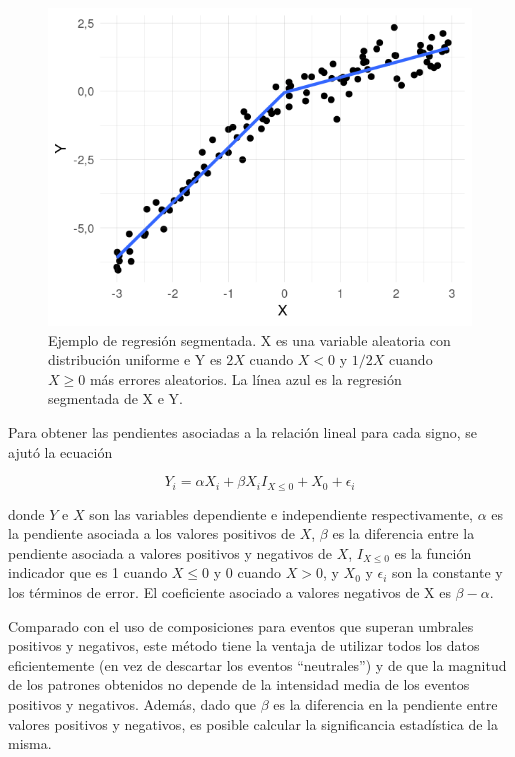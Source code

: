 \documentclass[12pt,oneside,a4paper]{reedthesis}
\begin{document}
\begin{figure}

{\centering \includegraphics{figures/30-sam/segmentada-ejemplo-1} 

}

\caption{Ejemplo de regresión segmentada. X es una variable aleatoria con distribución uniforme e Y es \(2X\) cuando \(X<0\) y \(1/2X\) cuando \(X\ge0\) más errores aleatorios. La línea azul es la regresión segmentada de X e Y.}\label{fig:segmentada-ejemplo}
\end{figure}



Para obtener las pendientes asociadas a la relación lineal para cada signo, se ajutó la ecuación

\[
Y_i = \alpha X_i + \beta X_iI_{X\le 0} + X_0 + \epsilon_i
\]

donde \(Y\) e \(X\) son las variables dependiente e independiente respectivamente, \(\alpha\) es la pendiente asociada a los valores positivos de \(X\), \(\beta\) es la diferencia entre la pendiente asociada a valores positivos y negativos de \(X\), \(I_{X\le 0}\) es la función indicador que es 1 cuando \(X\le0\) y 0 cuando \(X>0\), y \(X_0\) y \(\epsilon_i\) son la constante y los términos de error.
El coeficiente asociado a valores negativos de X es \(\beta - \alpha\).

Comparado con el uso de composiciones para eventos que superan umbrales positivos y negativos, este método tiene la ventaja de utilizar todos los datos eficientemente (en vez de descartar los eventos ``neutrales'') y de que la magnitud de los patrones obtenidos no depende de la intensidad media de los eventos positivos y negativos.
Además, dado que \(\beta\) es la diferencia en la pendiente entre valores positivos y negativos, es posible calcular la significancia estadística de la misma.
\end{document}
